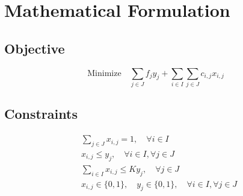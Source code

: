 \documentclass{article}
\begin{document}
\section*{Mathematical Formulation}

\subsection*{Objective}
\[
\text{Minimize} \quad \sum_{j \in J} f_j y_j + \sum_{i \in I} \sum_{j \in J} c_{i,j} x_{i,j}
\]

\subsection*{Constraints}
\begin{align}
& \sum_{j \in J} x_{i,j} = 1, \quad \forall i \in I \tag{Assignment Constraint} \\
& x_{i,j} \leq y_j, \quad \forall i \in I, \forall j \in J \tag{Hiring Constraint} \\
& \sum_{i \in I} x_{i,j} \leq K y_j, \quad \forall j \in J \tag{Capacity Constraint} \\
& x_{i,j} \in \{0, 1\}, \quad y_j \in \{0, 1\}, \quad \forall i \in I, \forall j \in J \tag{Binary Variables}
\end{align}
\end{document}
